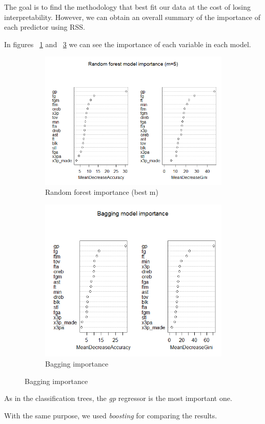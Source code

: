 The goal is to find the methodology that best fit our data at the cost of losing interpretability. However, we can obtain an overall summary of the importance of each predictor using RSS.

In figures \Fig~\ref{fig:best_for_500_var_imp_plot} and \Fig~\ref{fig:bagg_500_var_imp_plot} we can see the importance of each variable in each model.

\begin{figure}[h]
	\centering
	\begin{subfigure}{.6\textwidth}
		\centering
		\includegraphics[width=0.5\linewidth]{ImageFiles/Classification/best_for_500_var_imp_plot}
		\caption{Random forest importance (best m)}
		\label{fig:best_for_500_var_imp_plot}
	\end{subfigure}%
	\begin{subfigure}{.6\textwidth}
		\centering
		\includegraphics[width=0.5\linewidth]{ImageFiles/Classification/bagg_500_var_imp_plot}
		\caption{Bagging importance}
		\label{fig:bagg_500_var_imp_plot}
	\end{subfigure}
\end{figure}

As in the classification trees, the \textit{gp} regressor is the most important one.

With the same purpose, we used \textit{boosting} for comparing the results.

